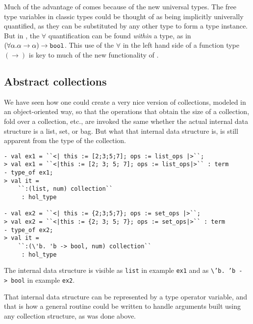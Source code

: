 Much of the advantage of \HOLW{} comes because of the new universal types.
The free type variables in classic \HOL{} types could be thought of as being
implicitly univerally quantified, as they can be substituted by any other type
to form a type instance. But in \HOLW{}, the $\forall$ quantification can be
found {\it within} a type, as in
$(\forall\alpha.\alpha \rightarrow \alpha) \rightarrow \mbox{\tt bool}$.
This use of the $\forall$ in the left hand side of a function type $(\rightarrow)$
is key to much of the new functionality of \HOLW.


\subsection{Abstract collections}

We have seen how one could create a very nice version of collections, modeled in an
object-oriented way, so that the operations that obtain the size of a collection,
fold over a collection, etc., are invoked the same whether the actual internal data
structure is a list, set, or bag.
But what that internal data structure is, is still apparent from the type of the
collection.
\begin{session}
\begin{verbatim}
- val ex1 = ``<| this := [2;3;5;7]; ops := list_ops |>``;
> val ex1 = ``<|this := [2; 3; 5; 7]; ops := list_ops|>`` : term
- type_of ex1;
> val it =
    ``:(list, num) collection``
     : hol_type

- val ex2 = ``<| this := {2;3;5;7}; ops := set_ops |>``;
> val ex2 = ``<|this := {2; 3; 5; 7}; ops := set_ops|>`` : term
- type_of ex2;
> val it =
    ``:(\'b. 'b -> bool, num) collection``
     : hol_type
\end{verbatim}
\end{session}
The internal data structure is visible as \texttt{list} in example \texttt{ex1}
and as \verb|\|\texttt{'b.~'b~->~bool} in example \texttt{ex2}.

That internal data structure can be represented by a \HOLW{} type operator variable,
and that is how a general routine could be written to handle arguments built
using any collection structure, as was done above.

